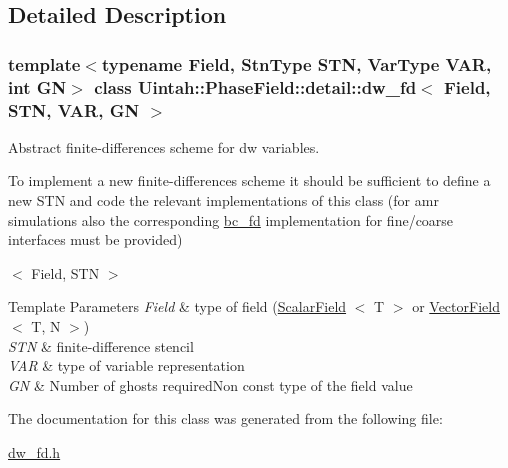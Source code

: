 \subsection{Detailed Description}
\subsubsection*{template$<$typename Field, Stn\+Type S\+TN, Var\+Type V\+AR, int GN$>$\newline
class Uintah\+::\+Phase\+Field\+::detail\+::dw\+\_\+fd$<$ Field, S\+T\+N, V\+A\+R, G\+N $>$}

Abstract finite-\/differences scheme for dw variables. 

To implement a new finite-\/differences scheme it should be sufficient to define a new S\+TN and code the relevant implementations of this class (for amr simulations also the corresponding \hyperlink{classUintah_1_1PhaseField_1_1detail_1_1bc__fd}{bc\+\_\+fd} implementation for fine/coarse interfaces must be provided)

$<$ Field, S\+TN $>$


\begin{DoxyTemplParams}{Template Parameters}
{\em Field} & type of field (\hyperlink{structUintah_1_1PhaseField_1_1ScalarField}{Scalar\+Field} $<$ T $>$ or \hyperlink{structUintah_1_1PhaseField_1_1VectorField}{Vector\+Field} $<$ T, N $>$) \\
\hline
{\em S\+TN} & finite-\/difference stencil \\
\hline
{\em V\+AR} & type of variable representation \\
\hline
{\em GN} & Number of ghosts required\+Non const type of the field value \\
\hline
\end{DoxyTemplParams}


The documentation for this class was generated from the following file\+:\begin{DoxyCompactItemize}
\item 
\hyperlink{dw__fd_8h}{dw\+\_\+fd.\+h}\end{DoxyCompactItemize}
